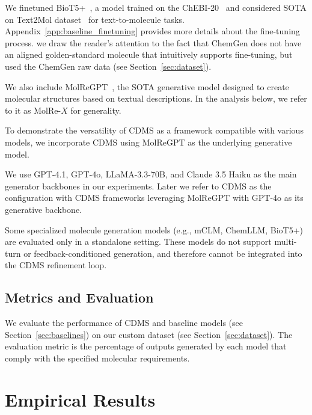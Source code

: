 \documentclass[10pt]{article} %
\begin{document}
    We finetuned BioT5+~\cite{pei2024biot5+}, a model trained on the ChEBI-20~\cite{Shardlow2018} and considered SOTA on Text2Mol dataset~\cite{edwards2021text2mol} for text-to-molecule tasks. Appendix~\ref{app:baseline_finetuning} provides more details about the fine-tuning process. we draw the reader’s attention to the fact that ChemGen does not have an aligned golden-standard molecule that intuitively supports fine-tuning, but used the ChemGen raw data (see Section~\ref{sec:dataset}).

    We also include MolReGPT~\cite{molregpt}, the SOTA generative model designed to create molecular structures based on textual descriptions. In the analysis below, we refer to it as MolRe-$X$ for generality.

    To demonstrate the versatility of CDMS as a framework compatible with various models, we incorporate CDMS using MolReGPT as the underlying generative model.

    We use GPT-4.1, GPT-4o, LLaMA-3.3-70B, and Claude 3.5 Haiku as the main generator backbones in our experiments. Later we refer to CDMS as the configuration with CDMS frameworks leveraging MolReGPT with GPT-4o as its generative backbone.

    Some specialized molecule generation models (e.g., mCLM, ChemLLM, BioT5+) are evaluated only in a standalone setting. These models do not support multi-turn or feedback-conditioned generation, and therefore cannot be integrated into the CDMS refinement loop.
    
    \subsection{Metrics and Evaluation}
    We evaluate the performance of CDMS and baseline models (see Section~\ref{sec:baselines}) on our custom dataset (see Section~\ref{sec:dataset}). The evaluation metric is the percentage of outputs generated by each model that comply with the specified molecular requirements.

    
\section{Empirical Results}
\end{document}

